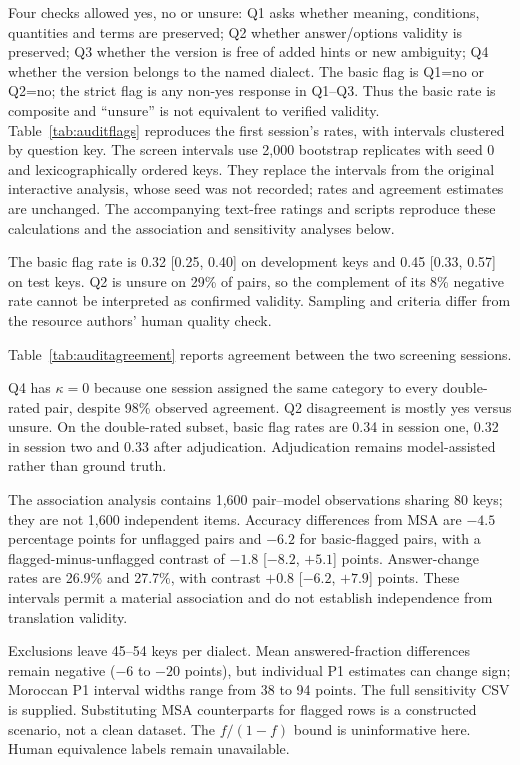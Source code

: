 \documentclass[applsci,article,submit,pdftex,oneauthor]{Definitions/mdpi}
\begin{document}
Four checks allowed yes, no or unsure: Q1 asks whether meaning, conditions, quantities and terms are preserved; Q2 whether answer/options validity is preserved; Q3 whether the version is free of added hints or new ambiguity; Q4 whether the version belongs to the named dialect. The basic flag is Q1=no or Q2=no; the strict flag is any non-yes response in Q1--Q3. Thus the basic rate is composite and ``unsure'' is not equivalent to verified validity. Table~\ref{tab:auditflags} reproduces the first session's rates, with intervals clustered by question key. The screen intervals use 2,000 bootstrap replicates with seed 0 and lexicographically ordered keys. They replace the intervals from the original interactive analysis, whose seed was not recorded; rates and agreement estimates are unchanged. The accompanying text-free ratings and scripts reproduce these calculations and the association and sensitivity analyses below.



The basic flag rate is 0.32 [0.25, 0.40] on development keys and 0.45 [0.33, 0.57] on test keys. Q2 is unsure on 29\% of pairs, so the complement of its 8\% negative rate cannot be interpreted as confirmed validity. Sampling and criteria differ from the resource authors' human quality check.

Table~\ref{tab:auditagreement} reports agreement between the two screening sessions.



Q4 has $\kappa=0$ because one session assigned the same category to every double-rated pair, despite 98\% observed agreement. Q2 disagreement is mostly yes versus unsure. On the double-rated subset, basic flag rates are 0.34 in session one, 0.32 in session two and 0.33 after adjudication. Adjudication remains model-assisted rather than ground truth.

The association analysis contains 1,600 pair--model observations sharing 80 keys; they are not 1,600 independent items. Accuracy differences from MSA are $-4.5$ percentage points for unflagged pairs and $-6.2$ for basic-flagged pairs, with a flagged-minus-unflagged contrast of $-1.8$ [$-8.2$, $+5.1$] points. Answer-change rates are 26.9\% and 27.7\%, with contrast $+0.8$ [$-6.2$, $+7.9$] points. These intervals permit a material association and do not establish independence from translation validity.

Exclusions leave 45--54 keys per dialect. Mean answered-fraction differences remain negative ($-6$ to $-20$ points), but individual P1 estimates can change sign; Moroccan P1 interval widths range from 38 to 94 points. The full sensitivity CSV is supplied. Substituting MSA counterparts for flagged rows is a constructed scenario, not a clean dataset. The $f/(1-f)$ bound is uninformative here. Human equivalence labels remain unavailable.
\end{document}
